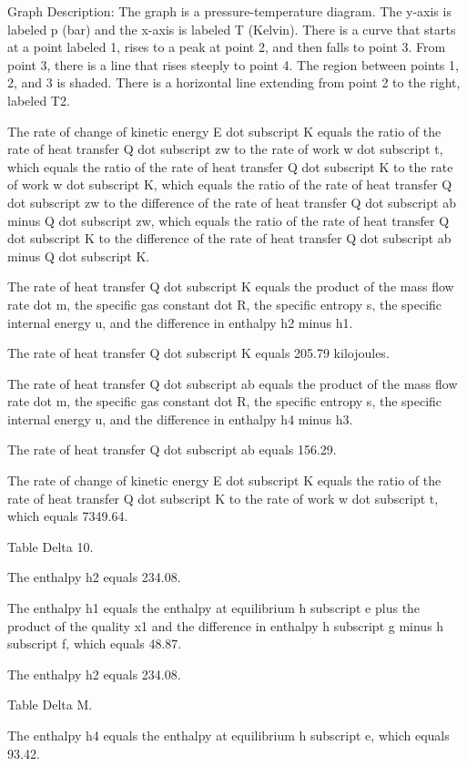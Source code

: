 Graph Description: The graph is a pressure-temperature diagram. The y-axis is labeled p (bar) and the x-axis is labeled T (Kelvin). There is a curve that starts at a point labeled 1, rises to a peak at point 2, and then falls to point 3. From point 3, there is a line that rises steeply to point 4. The region between points 1, 2, and 3 is shaded. There is a horizontal line extending from point 2 to the right, labeled T2.

The rate of change of kinetic energy E dot subscript K equals the ratio of the rate of heat transfer Q dot subscript zw to the rate of work w dot subscript t, which equals the ratio of the rate of heat transfer Q dot subscript K to the rate of work w dot subscript K, which equals the ratio of the rate of heat transfer Q dot subscript zw to the difference of the rate of heat transfer Q dot subscript ab minus Q dot subscript zw, which equals the ratio of the rate of heat transfer Q dot subscript K to the difference of the rate of heat transfer Q dot subscript ab minus Q dot subscript K.

The rate of heat transfer Q dot subscript K equals the product of the mass flow rate dot m, the specific gas constant dot R, the specific entropy s, the specific internal energy u, and the difference in enthalpy h2 minus h1.

The rate of heat transfer Q dot subscript K equals 205.79 kilojoules.

The rate of heat transfer Q dot subscript ab equals the product of the mass flow rate dot m, the specific gas constant dot R, the specific entropy s, the specific internal energy u, and the difference in enthalpy h4 minus h3.

The rate of heat transfer Q dot subscript ab equals 156.29.

The rate of change of kinetic energy E dot subscript K equals the ratio of the rate of heat transfer Q dot subscript K to the rate of work w dot subscript t, which equals 7349.64.

Table Delta 10.

The enthalpy h2 equals 234.08.

The enthalpy h1 equals the enthalpy at equilibrium h subscript e plus the product of the quality x1 and the difference in enthalpy h subscript g minus h subscript f, which equals 48.87.

The enthalpy h2 equals 234.08.

Table Delta M.

The enthalpy h4 equals the enthalpy at equilibrium h subscript e, which equals 93.42.